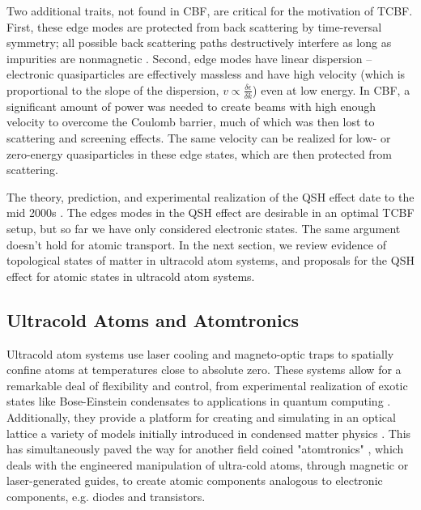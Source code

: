 \documentclass[onecolumn,
               superscriptaddress,
               floatfix,
               longbibliography, 
               showkeys,apl]{revtex4-2}
\begin{document}
Two additional traits, not found in CBF, are critical for the motivation of TCBF. First, these edge modes are protected from back scattering by time-reversal symmetry; all possible back scattering paths destructively interfere as long as impurities are nonmagnetic \cite{RevModPhys.83.1057}. Second, edge modes have linear dispersion -- electronic quasiparticles are effectively massless and have high velocity (which is proportional to the slope of the dispersion, $v \propto \frac{\delta\epsilon}{\delta k}$) even at low energy. In CBF, a significant amount of power was needed to create beams with high enough velocity to overcome the Coulomb barrier, much of which was then lost to scattering and screening effects. The same velocity can be realized for low- or zero-energy quasiparticles in these edge states, which are then protected from scattering.

The theory, prediction, and experimental realization of the QSH effect date to the mid 2000s \cite{PhysRevLett.95.146802,PhysRevLett.95.226801,doi:10.1126/science.1133734,doi:10.1126/science.1148047}. The edges modes in the QSH effect are desirable in an optimal TCBF setup, but so far we have only considered electronic states. The same argument doesn't hold for atomic transport. In the next section, we review evidence of topological states of matter in ultracold atom systems, and proposals for the QSH effect for atomic states in ultracold atom systems.

\subsection{Ultracold Atoms and Atomtronics}\label{sec:ColdAtoms}

Ultracold atom systems use laser cooling and magneto-optic traps to spatially confine atoms at temperatures close to absolute zero. These systems allow for a remarkable deal of flexibility and control, from experimental realization of exotic states like Bose-Einstein condensates \cite{RevModPhys.80.885} to applications in quantum computing \cite{PhysRevResearch.3.013113}. Additionally, they provide a platform for creating and simulating in an optical lattice a variety of models initially introduced in condensed matter physics \cite{TARRUELL2018365,Sch_fer_2020}. This has simultaneously paved the way for another field coined "atomtronics" \cite{Amico_2021}, which deals with the engineered manipulation of ultra-cold atoms, through magnetic or laser-generated guides, to create atomic components analogous to electronic components, e.g. diodes and transistors.
\end{document}

